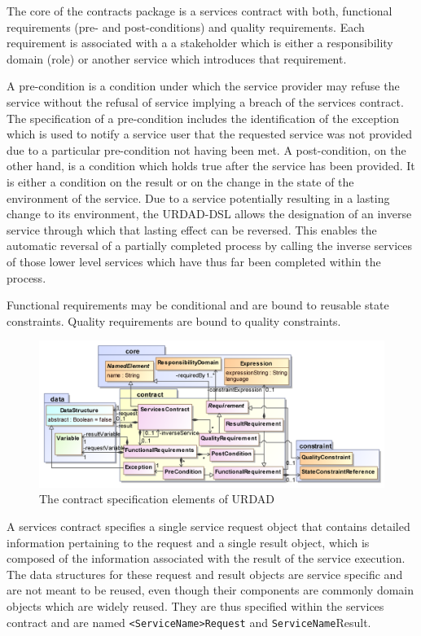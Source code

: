 The core of the contracts package is a services contract with both, functional requirements (pre- and post-conditions) and quality requirements. Each requirement is associated with a a stakeholder which is either a responsibility domain (role) or another service which introduces that requirement. 

A pre-condition is a condition under which the service provider may refuse the service without the refusal of service implying a breach of the services contract. The specification of a pre-condition includes the identification of the exception which is used to notify a service user that the requested service was not provided due to a particular pre-condition not having been met. A post-condition, on the other hand, is a condition which holds true after the service has been provided. It is either a condition on the result or on the change in the state of the environment of the service. Due to a service potentially resulting in a lasting change to its environment, the URDAD-DSL allows the designation of an inverse service through which that lasting effect can be reversed. This enables the automatic reversal of a partially completed process by calling the inverse services of those lower level services which have thus far been completed within the process.

Functional requirements may be conditional and are bound to reusable state constraints.  Quality requirements are bound to quality constraints.

\begin{figure}[Htbp]
  \centering
  \includegraphics{contract}
  \caption{The contract specification elements of URDAD}
  \label{fig:metamodel}
\end{figure}

A services contract specifies a single service request object that contains detailed information pertaining to the request and a single result object, which is composed of the information associated with the result of the service execution. The data structures for these request and result objects are service specific and are not meant to be reused, even though their components are commonly domain objects which are widely reused. They are thus specified within the services contract and are named \verb+<ServiceName>Request+ and \verb+ServiceName+Result.


